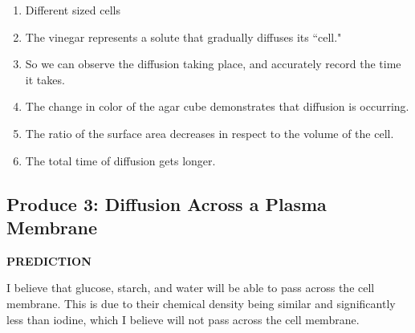 \documentclass{article}
\begin{document}
\begin{enumerate}[label=\textbf{\arabic*.}]
	\item
		Different sized cells
	\item
		The vinegar represents a solute that gradually diffuses its ``cell."
	\item
		So we can observe the diffusion taking place, and accurately record the time it takes.
	\item
		The change in color of the agar cube demonstrates that diffusion is occurring.
	\item
		The ratio of the surface area decreases in respect to the volume of the cell.
	\item
		The total time of diffusion gets longer.
\end{enumerate}

\subsection{Produce 3: Diffusion Across a Plasma Membrane}

\textbf{PREDICTION}

I believe that glucose, starch, and water will be able to pass across the cell membrane. This is due to their chemical density being similar and significantly less than iodine, which I believe will not pass across the cell membrane.
\end{document}
